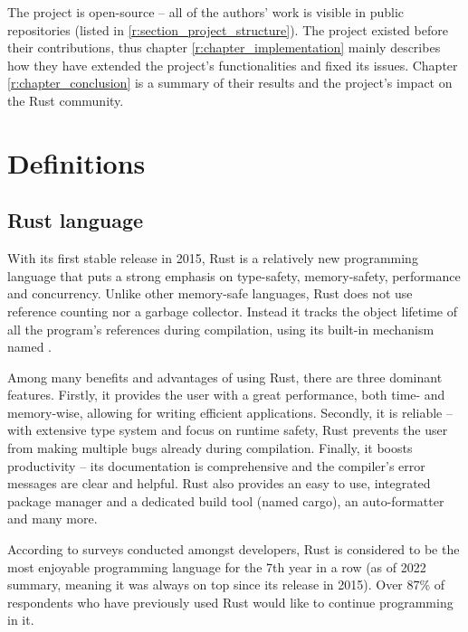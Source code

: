 \documentclass[licencjacka,en]{pracamgr}
\begin{document}
The project is open-source -- all of the authors' work is visible in public repositories (listed in
\ref{r:section_project_structure}). The project existed before their contributions, thus chapter
\ref{r:chapter_implementation} mainly describes how they have extended the project's
functionalities and fixed its issues. Chapter \ref{r:chapter_conclusion} is a summary of their
results and the project's impact on the Rust community.


\chapter{Definitions}\label{r:chapter_definitions}

\section{Rust language}\label{r:section_rust_language}

With its first stable release in 2015, Rust is a relatively new programming language that
puts a strong emphasis on type-safety, memory-safety, performance and concurrency. Unlike
other memory-safe languages, Rust does not use reference counting nor a garbage collector.
Instead it tracks the object lifetime of all the program's references during compilation,
using its built-in mechanism named .

Among many benefits and advantages of using Rust, there are three dominant features. Firstly,
it provides the user with a great performance, both time- and memory-wise, allowing for
writing efficient applications. Secondly, it is reliable -- with extensive type system and
focus on runtime safety, Rust prevents the user from making multiple bugs
already during compilation. Finally, it boosts productivity -- its documentation is
comprehensive and the compiler's error messages are clear and helpful. Rust also provides
an easy to use, integrated package manager and a dedicated build tool (named cargo),
an auto-formatter and many more.

According to surveys \cite{survey} conducted amongst developers, Rust is considered to be the most
enjoyable programming language for the 7th year in a row (as of 2022 summary, meaning it was always
on top since its release in 2015). Over 87\% of respondents who have previously used Rust would
like to continue programming in it.
\end{document}
